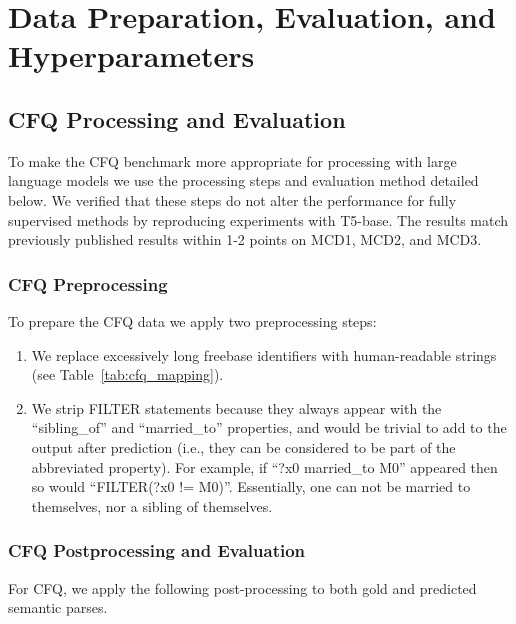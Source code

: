 \documentclass{article} \usepackage{iclr2022_conference,times}
\begin{document}
\section{Data Preparation, Evaluation, and Hyperparameters}
\label{app:data_prep_eval_hyper}

\subsection{CFQ Processing and Evaluation} 

To make the CFQ benchmark more appropriate for processing with large language models we use the processing steps and evaluation method detailed below. We verified that these steps do not alter the performance for fully supervised methods by reproducing experiments with T5-base. The results match previously published results within 1-2 points on MCD1, MCD2, and MCD3.

\subsubsection{CFQ Preprocessing \label{app:cfq_preprocessing}}

To prepare the CFQ data we apply two preprocessing steps:

\begin{enumerate}
    \item We replace excessively long freebase identifiers with human-readable strings (see Table~\ref{tab:cfq_mapping}).
    \item We strip FILTER statements because they always appear with the ``sibling\_of'' and ``married\_to'' properties, and would be trivial to add to the output after prediction (i.e., they can be considered to be part of the abbreviated property). For example, if ``?x0 married\_to M0'' appeared then so would ``FILTER(?x0 != M0)''. Essentially, one can not be married to themselves, nor a sibling of themselves.
\end{enumerate}

\subsubsection{CFQ Postprocessing and Evaluation \label{app:cfq_postprocessing}}

For CFQ, we apply the following post-processing to both gold and predicted semantic parses.
\end{document}
